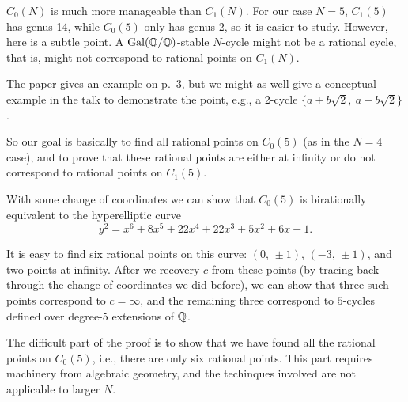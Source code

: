 $C_0(N)$ is much more manageable than $C_1(N)$. For our case $N = 5$,
$C_1(5)$ has genus 14, while $C_0(5)$ only has genus 2, so it is
easier to study. However, here is a subtle point. A
$\mathrm{Gal}(\bar{\mathbb{Q}}/\mathbb{Q})$-stable $N$-cycle might not be a rational cycle,
that is, might not correspond to rational points on $C_1(N)$.

\begin{example}
  The paper gives an example on p.~3, but we might as well give a
  conceptual example in the talk to demonstrate the point, e.g., a
  2-cycle $\{a + b \sqrt{2},\ a - b \sqrt{2}\}$.
\end{example}

So our goal is basically to find all rational points on $C_0(5)$ (as
in the $N=4$ case), and to prove that these rational points are either
at infinity or do not correspond to rational points on $C_1(5)$.

With some change of coordinates we can show that $C_0(5)$ is
birationally equivalent to the hyperelliptic curve
\[
y^2 = x^6 + 8x^5 + 22x^4 + 22x^3 + 5x^2 + 6x + 1.
\]

It is easy to find six rational points on this curve: $(0,\, \pm 1)$,
$(-3,\, \pm 1)$, and two points at infinity. After we recovery $c$
from these points (by tracing back through the change of coordinates
we did before), we can show that three such points correspond to $c =
\infty$, and the remaining three correspond to $5$-cycles defined over
degree-5 extensions of $\mathbb{Q}$.

The difficult part of the proof is to show that we have found all the
rational points on $C_0(5)$, i.e., there are only six rational
points. This part requires machinery from algebraic geometry, and the
techinques involved are not applicable to larger $N$.


